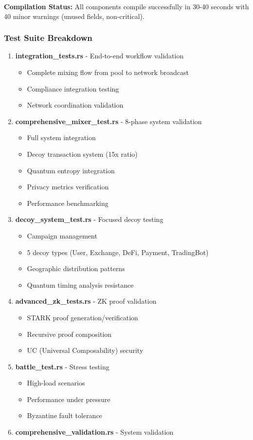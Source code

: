 \documentclass[12pt,a4paper]{article}
\begin{document}
\textbf{Compilation Status:} All components compile successfully in 30-40 seconds with 40 minor warnings (unused fields, non-critical).

\subsubsection{Test Suite Breakdown}

\begin{enumerate}
\item \textbf{integration\_tests.rs} - End-to-end workflow validation
\begin{itemize}
\item Complete mixing flow from pool to network broadcast
\item Compliance integration testing
\item Network coordination validation
\end{itemize}

\item \textbf{comprehensive\_mixer\_test.rs} - 8-phase system validation
\begin{itemize}
\item Full system integration
\item Decoy transaction system (15x ratio)
\item Quantum entropy integration
\item Privacy metrics verification
\item Performance benchmarking
\end{itemize}

\item \textbf{decoy\_system\_test.rs} - Focused decoy testing
\begin{itemize}
\item Campaign management
\item 5 decoy types (User, Exchange, DeFi, Payment, TradingBot)
\item Geographic distribution patterns
\item Quantum timing analysis resistance
\end{itemize}

\item \textbf{advanced\_zk\_tests.rs} - ZK proof validation
\begin{itemize}
\item STARK proof generation/verification
\item Recursive proof composition
\item UC (Universal Composability) security
\end{itemize}

\item \textbf{battle\_test.rs} - Stress testing
\begin{itemize}
\item High-load scenarios
\item Performance under pressure
\item Byzantine fault tolerance
\end{itemize}

\item \textbf{comprehensive\_validation.rs} - System validation
\end{enumerate}
\end{document}
